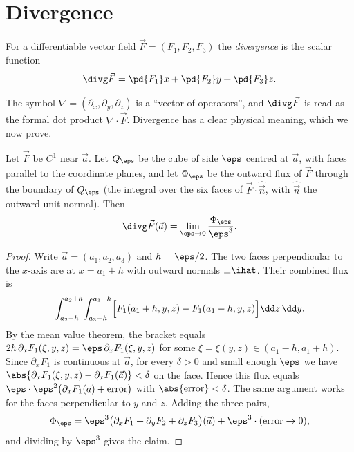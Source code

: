 \section{Divergence}

\begin{definition}[Divergence]
For a differentiable vector field $\vec F=(F_1,F_2,F_3)$ the \emph{divergence} is the scalar function
\[
\divg\vec F=\pd{F_1}x+\pd{F_2}y+\pd{F_3}z .
\]
\end{definition}

The symbol $\nabla=(\partial_x,\partial_y,\partial_z)$ is a ``vector of operators'', and $\divg\vec F$ is read as the formal dot product $\nabla\cdot\vec F$. Divergence has a clear physical meaning, which we now prove.

\begin{theorem}[Divergence = flux per unit volume]\label{thm:divmeaning}
Let $\vec F$ be $C^1$ near $\vec a$. Let $Q_\eps$ be the cube of side $\eps$ centred at $\vec a$, with faces parallel to the coordinate planes, and let $\Phi_\eps$ be the outward flux of $\vec F$ through the boundary of $Q_\eps$ (the integral over the six faces of $\vec F\cdot\hat{\vec n}$, with $\hat{\vec n}$ the outward unit normal). Then
\[
\divg\vec F(\vec a)=\lim_{\eps\to0}\frac{\Phi_\eps}{\eps^3}.
\]
\end{theorem}

\begin{proof}
Write $\vec a=(a_1,a_2,a_3)$ and $h=\eps/2$. The two faces perpendicular to the $x$-axis are at $x=a_1\pm h$ with outward normals $\pm\ihat$. Their combined flux is
\[
\int_{a_2-h}^{a_2+h}\!\int_{a_3-h}^{a_3+h}\Bigl[F_1(a_1+h,y,z)-F_1(a_1-h,y,z)\Bigr]\dd z\,\dd y .
\]
By the mean value theorem, the bracket equals $2h\,\partial_xF_1(\xi,y,z)=\eps\,\partial_xF_1(\xi,y,z)$ for some $\xi=\xi(y,z)\in(a_1-h,a_1+h)$. Since $\partial_xF_1$ is continuous at $\vec a$, for every $\delta>0$ and small enough $\eps$ we have $\abs{\partial_xF_1(\xi,y,z)-\partial_xF_1(\vec a)}<\delta$ on the face. Hence this flux equals $\eps\cdot\eps^2\bigl(\partial_xF_1(\vec a)+\text{error}\bigr)$ with $\abs{\text{error}}<\delta$. The same argument works for the faces perpendicular to $y$ and $z$. Adding the three pairs,
\[
\Phi_\eps=\eps^3\bigl(\partial_xF_1+\partial_yF_2+\partial_zF_3\bigr)(\vec a)+\eps^3\cdot(\text{error}\to0),
\]
and dividing by $\eps^3$ gives the claim.
\end{proof}


